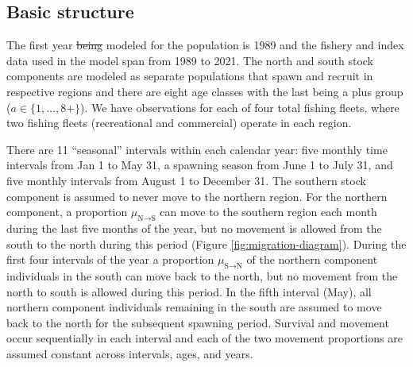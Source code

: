 \documentclass[
]{article}
\makeatletter
\providecommand{\DIFdeltex}[1]{{\protect\color{red}\sout{#1}}} %
\providecommand{\DIFdelbegin}{} %
\providecommand{\DIFdelend}{} %
\providecommand{\DIFdel}[1]{\texorpdfstring{\DIFdeltex{#1}}{}} %
\newcommand{\DIFscaledelfig}{0.5}
\newlength{\DIFdelgraphicswidth} %
\newlength{\DIFdelgraphicsheight} %
\newcommand{\DIFdelincludegraphics}[2][]{%
\sbox{\DIFdelgraphicsbox}{\DIFOincludegraphics[#1]{#2}}%
\settoboxwidth{\DIFdelgraphicswidth}{\DIFdelgraphicsbox} %
\settoboxtotalheight{\DIFdelgraphicsheight}{\DIFdelgraphicsbox} %
\scalebox{\DIFscaledelfig}{%
\parbox[b]{\DIFdelgraphicswidth}{\usebox{\DIFdelgraphicsbox}\\[-\baselineskip] \rule{\DIFdelgraphicswidth}{0em}}\llap{\resizebox{\DIFdelgraphicswidth}{\DIFdelgraphicsheight}{%
\setlength{\unitlength}{\DIFdelgraphicswidth}%
\begin{picture}(1,1)%
\thicklines\linethickness{2pt} %
{\color[rgb]{1,0,0}\put(0,0){\framebox(1,1){}}}%
{\color[rgb]{1,0,0}\put(0,0){\line( 1,1){1}}}%
{\color[rgb]{1,0,0}\put(0,1){\line(1,-1){1}}}%
\end{picture}%
}\hspace*{3pt}}} %
} %
\DeclareRobustCommand{\DIFdelbegin}{\DIFOdelbegin \let\includegraphics\DIFdelincludegraphics} %
\DeclareRobustCommand{\DIFdelend}{\DIFOaddend \let\includegraphics\DIFOincludegraphics} %
\let\sout@orig\sout %
\renewcommand{\sout}[1]{\ifmmode\text{\sout@orig{\ensuremath{#1}}}\else\sout@orig{#1}\fi} %
\makeatother
\begin{document}
\hypertarget{basic-structure}{%
\subsection*{Basic structure}\label{basic-structure}}

The first year \DIFdelbegin \DIFdel{being }\DIFdelend modeled for the population is 1989 and the fishery and index data used in the model span from 1989 to 2021. The north and south stock components are modeled as separate populations that spawn and recruit in respective regions and there are eight age classes with the last being a plus group (\(a \in \{1,\ldots,8+\}\)). We have observations for each of four total fishing fleets, where two fishing fleets (recreational and commercial) operate in each region.

There are 11 ``seasonal'' intervals within each calendar year: five monthly time intervals from Jan 1 to May 31, a spawning season from June 1 to July 31, and five monthly intervals from August 1 to December 31. The southern stock component is assumed to never move to the northern region. For the northern component, a proportion \(\mu_{\text{N}\rightarrow \text{S}}\) can move to the southern region each month during the last five months of the year, but no movement is allowed from the south to the north during this period (Figure \ref{fig:migration-diagram}). During the first four intervals of the year a proportion \(\mu_{\text{S}\rightarrow \text{N}}\) of the northern component individuals in the south can move back to the north, but no movement from the north to south is allowed during this period. In the fifth interval (May), all northern component individuals remaining in the south are assumed to move back to the north for the subsequent spawning period. Survival and movement occur sequentially in each interval and each of the two movement proportions are assumed constant across intervals, ages, and years.
\end{document}
